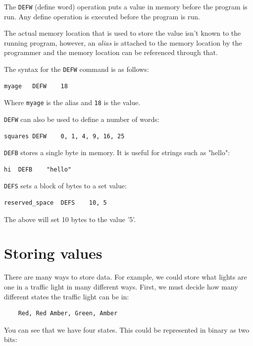 The \texttt{DEFW} (define word) operation puts a value in memory before the program is run. Any define operation is executed before the program is run.

The actual memory location that is used to store the value isn't known to the running program, however, an {\it alias} is attached to the memory location by the programmer and the memory location can be referenced through that.

The syntax for the \texttt{DEFW} command is as follows:

\begin{verbatim}
myage	DEFW	18
\end{verbatim}

Where {\tt myage} is the alias and {\tt 18} is the value.

{\tt DEFW} can also be used to define a number of words:

\begin{verbatim}
squares	DEFW	0, 1, 4, 9, 16, 25
\end{verbatim}

{\tt DEFB} stores a single byte in memory. It is useful for strings such as "hello":

\begin{verbatim}
hi	DEFB	"hello"
\end{verbatim}

{\tt DEFS} sets a block of bytes to a set value:

\begin{verbatim}
reserved_space	DEFS	10, 5
\end{verbatim}

The above will set 10 bytes to the value '5'.

\section{Storing values}


There are many ways to store data. For example, we could store what lights are
one in a traffic light in many different ways. First, we must decide how many
different states the traffic light can be in:

\begin{verbatim}
	Red, Red Amber, Green, Amber
\end{verbatim}

You can see that we have four states. This could be represented in binary as two
bits:


